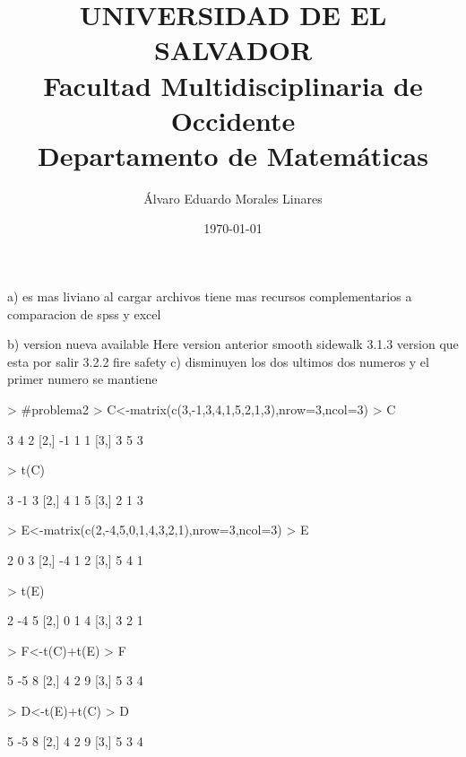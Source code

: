 \documentclass{article}
\author{Álvaro Eduardo Morales Linares}
\title{UNIVERSIDAD DE EL SALVADOR\\ Facultad Multidisciplinaria de Occidente\\ Departamento de Matemáticas}
\date{\today}
\begin{document}

\maketitle
\newpage

a) es mas liviano al cargar archivos tiene mas recursos complementarios a comparacion de spss y excel
  
b)
version nueva
available Here
version anterior
smooth sidewalk
3.1.3
version que esta por salir
3.2.2
fire safety
c) disminuyen los dos ultimos dos numeros y el primer numero se mantiene
\begin{Schunk}
\begin{Sinput}
> #problema2
> C<-matrix(c(3,-1,3,4,1,5,2,1,3),nrow=3,ncol=3)
> C         
\end{Sinput}
\begin{Soutput}
     [,1] [,2] [,3]
[1,]    3    4    2
[2,]   -1    1    1
[3,]    3    5    3
\end{Soutput}
\begin{Sinput}
> t(C)
\end{Sinput}
\begin{Soutput}
     [,1] [,2] [,3]
[1,]    3   -1    3
[2,]    4    1    5
[3,]    2    1    3
\end{Soutput}
\begin{Sinput}
> E<-matrix(c(2,-4,5,0,1,4,3,2,1),nrow=3,ncol=3)
> E
\end{Sinput}
\begin{Soutput}
     [,1] [,2] [,3]
[1,]    2    0    3
[2,]   -4    1    2
[3,]    5    4    1
\end{Soutput}
\begin{Sinput}
> t(E)
\end{Sinput}
\begin{Soutput}
     [,1] [,2] [,3]
[1,]    2   -4    5
[2,]    0    1    4
[3,]    3    2    1
\end{Soutput}
\begin{Sinput}
> F<-t(C)+t(E)
> F
\end{Sinput}
\begin{Soutput}
     [,1] [,2] [,3]
[1,]    5   -5    8
[2,]    4    2    9
[3,]    5    3    4
\end{Soutput}
\begin{Sinput}
> D<-t(E)+t(C)
> D
\end{Sinput}
\begin{Soutput}
     [,1] [,2] [,3]
[1,]    5   -5    8
[2,]    4    2    9
[3,]    5    3    4
\end{Soutput}

\end{Schunk}
\end{document}
